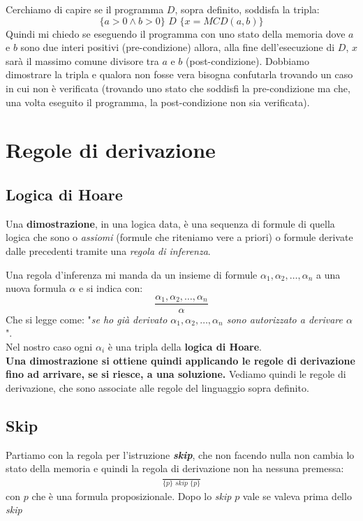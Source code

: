 Cerchiamo di capire se il programma $D$, sopra definito, soddisfa la tripla:
\[\{a>0\land b>0\}\,\,D\,\, \{x=MCD(a,b)\}\]
Quindi mi chiedo se eseguendo il programma con uno stato della memoria dove $a$
e $b$ sono due interi positivi (pre-condizione) allora, alla fine dell'esecuzione
di $D$, $x$ sarà il massimo comune divisore tra $a$ e $b$
(post-condizione). Dobbiamo dimostrare la tripla e qualora non fosse vera bisogna
confutarla trovando un caso in cui non è verificata (trovando uno stato che
soddisfi la pre-condizione ma che, una volta eseguito il programma, la post-condizione non 
sia verificata).
\section{Regole di derivazione}
\subsection{Logica di Hoare}
\begin{definizione}
	Una \textbf{dimostrazione}, in una logica data, è una sequenza di formule di
	quella logica che sono o \textit{assiomi} (formule che riteniamo vere a
	priori) o formule derivate dalle precedenti tramite una \textit{regola di
	inferenza}. 
\end{definizione}
Una regola d'inferenza mi manda da un insieme di formule
$\alpha_1,\alpha_2,\ldots,\alpha_n$ a una nuova formula $\alpha$ e si indica
con: 
\[\frac{\alpha_1,\alpha_2,\ldots,\alpha_n}{\alpha}\]
Che si legge come: "\textit{se ho già derivato $\alpha_1, \alpha_2,
	\ldots,\alpha_n$ sono autorizzato a derivare $\alpha$}".\\ 
Nel nostro caso ogni $\alpha_i$ è una tripla della \textbf{logica di Hoare}.\\
\textbf{Una dimostrazione si ottiene quindi applicando le regole di derivazione fino
ad arrivare, se si riesce, a una soluzione.}
Vediamo quindi le regole di derivazione, che sono associate alle regole del
linguaggio sopra definito.
\subsection{Skip}
\begin{definizione}
	Partiamo con la regola per l'istruzione \textbf{\textit{skip}}, che non
	facendo nulla 
	non cambia lo stato della memoria e quindi la regola di derivazione non ha
	nessuna premessa:
	\begin{align}\label{SkipRule}
		\frac{}{\{p\}\,\,skip\,\,\{p\}} 
	\end{align}
	con $p$ che è una formula proposizionale. Dopo lo \textit{skip} $p$ vale se
	valeva prima dello \textit{skip}
\end{definizione}
